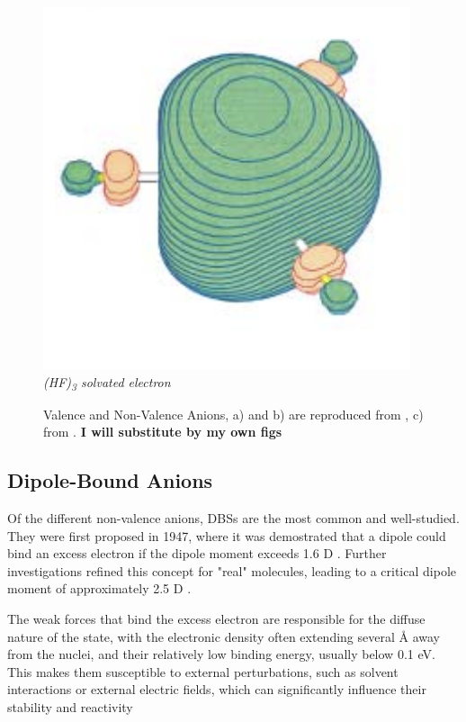 \begin{figure}[h]
\begin{minipage}[b]{0.27\textwidth}
    \includegraphics[width=\textwidth]{chapters/introduction/image/hf3.png}
    \small\emph{(HF)\textsubscript{3} solvated electron}
  \end{minipage}
  \caption[Valence and Non-Valence Anions]{Valence and Non-Valence Anions, a) and b) are reproduced from \cite{dutta2015electron}, c) from \cite{jordan2003theory}. \textbf{I will substitute by my own figs}}
  \label{fig:AnionTypes}
\end{figure}

\subsection{Dipole-Bound Anions}
Of the different non-valence anions, DBSs are the most common and well-studied. They were first proposed in 1947, where it was demostrated that a dipole could bind an excess electron if the dipole moment exceeds 1.6 D \cite{fermi1947capture}. Further investigations refined this concept for "real" molecules, leading to a critical dipole moment of approximately 2.5 D \cite{jordan2003theory}.

The weak forces that bind the excess electron are responsible for the diffuse nature of the state, with the electronic density often extending several Å away from the nuclei, and their relatively low binding energy, usually below 0.1 eV. This makes them susceptible to external perturbations, such as solvent interactions or external electric fields, which can significantly influence their stability and reactivity \cite{schiedt1998anion,hall2002two,jalbout2001dipole,gutowski2002solvated,skurski2002excess,jordan2003theory,eustis2007photoelectron,simons2008molecular,herbert2015quantum,clarke2025role}

